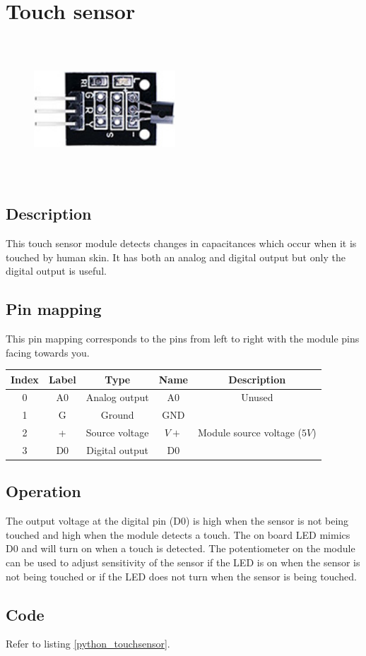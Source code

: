 \section{Touch sensor}
\begin{figure}[H]
    \centering
    \includegraphics[angle=0, keepaspectratio=true, scale=1, width=200px, height=200px]{images/touch_sensor.jpg}
\end{figure}
\subsection*{Description}
This touch sensor module detects changes in capacitances which occur when it is touched by human skin. It has both an analog and digital output but only the digital output is useful.

\subsection*{Pin mapping}
This pin mapping corresponds to the pins from left to right with the module pins facing towards you.
\begin{table}[H]
    \centering
    \begin{tabular}{|c|c|c|c|c|}
    \hline
    Index &Label &Type &Name &Description\\ \hline
    0 &A0 &Analog output &A0 &Unused\\ \hline
    1 &G &Ground &GND &\\ \hline
    2 &+ &Source voltage &$V+$ &Module source voltage ($5V$)\\ \hline
    3 &D0 &Digital output &D0 &\\ \hline
    \end{tabular}
\end{table}
\subsection*{Operation}
The output voltage at the digital pin (D0) is high when the sensor is not being touched and high when the module detects a touch. The on board LED mimics D0 and will turn on when a touch is detected. The potentiometer on the module can be used to adjust sensitivity of the sensor if the LED is on when the sensor is not being touched or if the LED does not turn when the sensor is being touched.
\subsection*{Code}
Refer to listing \ref{python_touchsensor}.
%